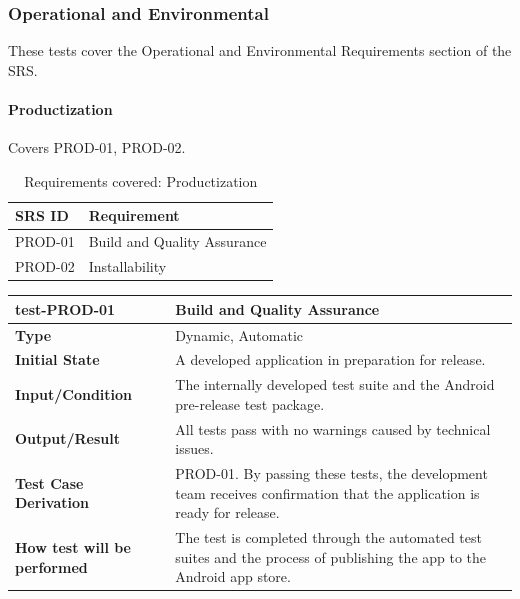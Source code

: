 \documentclass[12pt, titlepage]{article}
\begin{document}
\subsubsection{Operational and Environmental}

These tests cover the Operational and Environmental Requirements section of the SRS.

\paragraph{Productization}

Covers PROD-01, PROD-02.

\begin{table}[H]
  \caption{Requirements covered: Productization}
  \noindent\begin{tabularx}{\textwidth}{p{3cm}X}
  \toprule
  \textbf{SRS ID} & \textbf{Requirement} \\
  \midrule
  PROD-01 & Build and Quality Assurance \\
  PROD-02 & Installability \\
  \bottomrule
\end{tabularx}
\end{table}

\vspace{1em}

\noindent\begin{tabularx}{\textwidth}{>{\raggedright\arraybackslash}p{3.5cm}X}
  \toprule
  \textbf{test-PROD-01} & \textbf{Build and Quality Assurance}\\
  \midrule
  \textbf{Type} & Dynamic, Automatic\\
  \textbf{Initial State} & A developed application in preparation for release.\\
  \textbf{Input/Condition} & The internally developed test suite and the Android pre-release test package.\\
  \textbf{Output/Result} & All tests pass with no warnings caused by technical issues.\\
  \textbf{Test Case Derivation} & PROD-01. By passing these tests, the development team receives confirmation that the application is ready for release.\\
  \textbf{How test will be performed} & The test is completed through the automated test suites and the process of publishing the app to the Android app store.\\
  \bottomrule
\end{tabularx}
\end{document}
